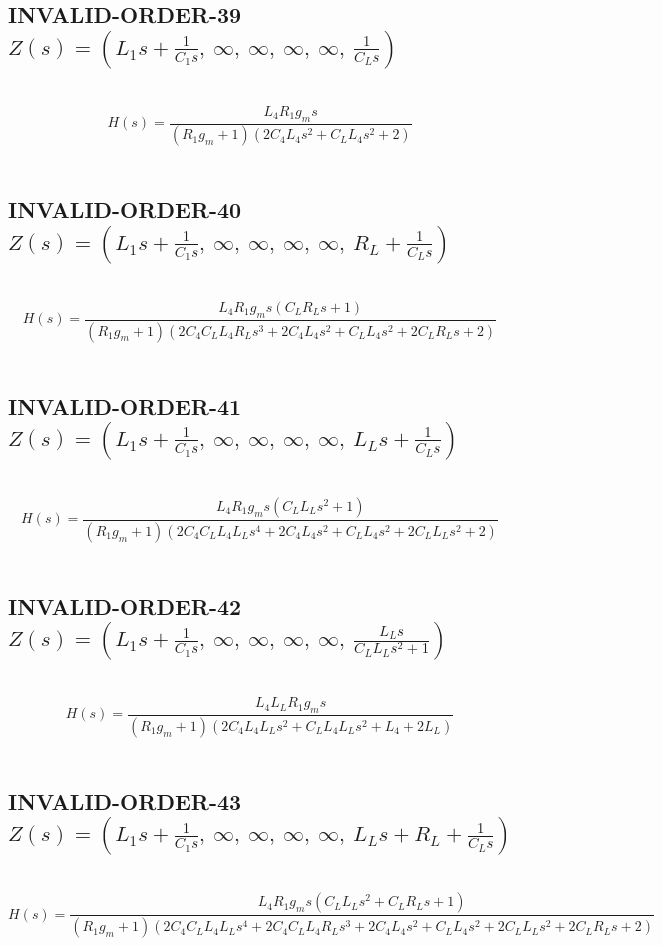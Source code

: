 \documentclass{article}
\begin{document}
\subsection{INVALID-ORDER-39 $Z(s) = \left( L_{1} s + \frac{1}{C_{1} s}, \  \infty, \  \infty, \  \infty, \  \infty, \  \frac{1}{C_{L} s}\right)$ } \ 
\textbf{\[H(s) = \frac{L_{4} R_{1} g_{m} s}{\left(R_{1} g_{m} + 1\right) \left(2 C_{4} L_{4} s^{2} + C_{L} L_{4} s^{2} + 2\right)}\] } \ 
\subsection{INVALID-ORDER-40 $Z(s) = \left( L_{1} s + \frac{1}{C_{1} s}, \  \infty, \  \infty, \  \infty, \  \infty, \  R_{L} + \frac{1}{C_{L} s}\right)$ } \ 
\textbf{\[H(s) = \frac{L_{4} R_{1} g_{m} s \left(C_{L} R_{L} s + 1\right)}{\left(R_{1} g_{m} + 1\right) \left(2 C_{4} C_{L} L_{4} R_{L} s^{3} + 2 C_{4} L_{4} s^{2} + C_{L} L_{4} s^{2} + 2 C_{L} R_{L} s + 2\right)}\] } \ 
\subsection{INVALID-ORDER-41 $Z(s) = \left( L_{1} s + \frac{1}{C_{1} s}, \  \infty, \  \infty, \  \infty, \  \infty, \  L_{L} s + \frac{1}{C_{L} s}\right)$ } \ 
\textbf{\[H(s) = \frac{L_{4} R_{1} g_{m} s \left(C_{L} L_{L} s^{2} + 1\right)}{\left(R_{1} g_{m} + 1\right) \left(2 C_{4} C_{L} L_{4} L_{L} s^{4} + 2 C_{4} L_{4} s^{2} + C_{L} L_{4} s^{2} + 2 C_{L} L_{L} s^{2} + 2\right)}\] } \ 
\subsection{INVALID-ORDER-42 $Z(s) = \left( L_{1} s + \frac{1}{C_{1} s}, \  \infty, \  \infty, \  \infty, \  \infty, \  \frac{L_{L} s}{C_{L} L_{L} s^{2} + 1}\right)$ } \ 
\textbf{\[H(s) = \frac{L_{4} L_{L} R_{1} g_{m} s}{\left(R_{1} g_{m} + 1\right) \left(2 C_{4} L_{4} L_{L} s^{2} + C_{L} L_{4} L_{L} s^{2} + L_{4} + 2 L_{L}\right)}\] } \ 
\subsection{INVALID-ORDER-43 $Z(s) = \left( L_{1} s + \frac{1}{C_{1} s}, \  \infty, \  \infty, \  \infty, \  \infty, \  L_{L} s + R_{L} + \frac{1}{C_{L} s}\right)$ } \ 
\textbf{\[H(s) = \frac{L_{4} R_{1} g_{m} s \left(C_{L} L_{L} s^{2} + C_{L} R_{L} s + 1\right)}{\left(R_{1} g_{m} + 1\right) \left(2 C_{4} C_{L} L_{4} L_{L} s^{4} + 2 C_{4} C_{L} L_{4} R_{L} s^{3} + 2 C_{4} L_{4} s^{2} + C_{L} L_{4} s^{2} + 2 C_{L} L_{L} s^{2} + 2 C_{L} R_{L} s + 2\right)}\] } \ 
\end{document}
